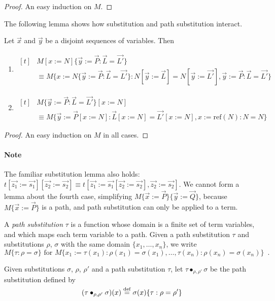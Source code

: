 \documentclass[a4paper,UKenglish]{lipics-v2016}
\newcommand*{\eqdef}{\mathrel{\smash{\stackrel{\text{def}}{=}}}}
\newcommand*{\reff}[1]{\ensuremath{\mathrm{ref} \left( {#1} \right)}}
\theoremstyle{plain}
\begin{document}
\begin{proof}
An easy induction on $M$.
\end{proof}

The following lemma shows how substitution and path substitution interact.

\begin{lemma}[Substitution]
\label{lm:subpathsub}
Let $\vec{x}$ and $\vec{y}$ be a disjoint sequences of variables.  Then
\begin{enumerate}
\item
\label{lm:subpathsubi}
$ \begin{aligned}[t]
& M [ x:= N ] \{ \vec{y} := \vec{P} : \vec{L} = \vec{L'} \} \\
& \equiv M \{ x := N \{ \vec{y} := \vec{P} : \vec{L} = \vec{L'} \} : N [ \vec{y}:= \vec{L} ] = N [ \vec{y} := \vec{L'} ], \vec{y} := \vec{P} : \vec{L} = \vec{L'} \}
\end{aligned} $
\item
\label{lm:subpathsubii}
$ \begin{aligned}[t]
& M \{ \vec{y} := \vec{P} : \vec{L} = \vec{L'} \} [ x := N ] \\
& \equiv M \{ \vec{y} := \vec{P} [x := N] : \vec{L} [x := N] = \vec{L'} [x := N], x := \reff{N} : N = N \}
\end{aligned} $
\end{enumerate}
\end{lemma}

\begin{proof}
An easy induction on $M$ in all cases.
\end{proof}

\paragraph*{Note}
The familiar substitution lemma also holds: $t [\vec{z_1} := \vec{s_1}] [\vec{z_2} := \vec{s_2}] \equiv t [\vec{z_1} := \vec{s_1}[\vec{z_2} := \vec{s_2}], 
\vec{z_2} := \vec{s_2}]$.  We cannot form a lemma about the fourth case, simplifying $M \{ \vec{x} := \vec{P} \} \{ \vec{y} := \vec{Q} \}$, because
$M \{ \vec{x} := \vec{P} \}$ is a path, and path substitution can only be applied to a term.

\begin{definition}
A \emph{path substitution} $\tau$ is a function whose domain is a finite set of term variables,
and which maps each term variable to a path.  Given a path substitution $\tau$ and substitutions $\rho$, $\sigma$
with the same domain $\{ x_1, \ldots, x_n \}$, we write
\[ M \{ \tau : \rho = \sigma \} \text{ for } M \{ x_1 := \tau(x_1) : \rho(x_1) = \sigma(x_1), \ldots, \tau(x_n) : \rho(x_n) = \sigma(x_n) \} \enspace . \]

Given substitutions $\sigma$, $\rho$, $\rho'$ and a path substitution $\tau$, let $\tau \bullet_{\rho, \rho'} \sigma$ be the path substitution defined by
\[ (\tau \bullet_{\rho, \rho'} \sigma)(x) \eqdef \sigma(x)\{ \tau : \rho = \rho' \} \]
\end{definition}
\end{document}
